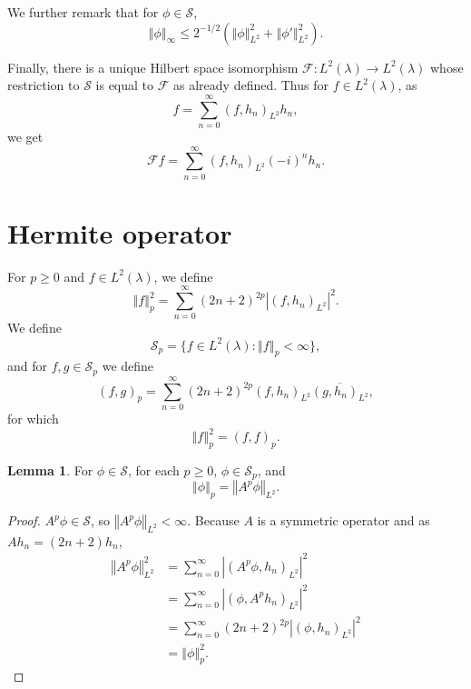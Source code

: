 \documentclass{article}
\newcommand{\norm}[1]{\left\Vert #1 \right\Vert}
\theoremstyle{definition}
\newtheorem{lemma}[theorem]{Lemma}
\theoremstyle{definition}
\begin{document}
We further remark that for $\phi \in \mathscr{S}$,
\begin{equation}
\norm{\phi}_{\infty} \leq 2^{-1/2}(\norm{\phi}_{L^2}^2+\norm{\phi'}_{L^2}^2).
\label{supremum}
\end{equation}

Finally, there is a unique Hilbert space isomorphism $\mathscr{F}:L^2(\lambda) \to L^2(\lambda)$ whose
restriction to $\mathscr{S}$ is equal to $\mathscr{F}$ as already defined. Thus for $f \in L^2(\lambda)$, as
\[
f=\sum_{n=0}^\infty (f,h_n)_{L^2} h_n,
\]
we get
\[
\mathscr{F}f = \sum_{n=0}^\infty (f,h_n)_{L^2} (-i)^n h_n.
\]


\section{Hermite operator}
For $p \geq 0$ and $f \in L^2(\lambda)$, we define
\[
\norm{f}_p^2 = \sum_{n=0}^\infty (2n+2)^{2p} |(f,h_n)_{L^2}|^2.
\]
We define 
\[
\mathscr{S}_p = \{f \in L^2(\lambda): \norm{f}_p < \infty\},
\]
and for $f,g \in \mathscr{S}_p$ we define
\[
(f,g)_p = \sum_{n=0}^\infty (2n+2)^{2p} (f,h_n)_{L^2} \overline{(g,h_n)_{L^2}},
\]
for which
\[
\norm{f}_p^2 = (f,f)_p. 
\]

\begin{lemma}
For $\phi \in \mathscr{S}$, for each $p \geq 0$, $\phi \in \mathscr{S}_p$,
and 
\[
\norm{\phi}_p = \norm{A^p \phi}_{L^2}.
\]
\label{phermite}
\end{lemma}
\begin{proof}
$A^p \phi \in \mathscr{S}$, so
$\norm{A^p \phi}_{L^2}<\infty$. 
Because $A$ is a symmetric operator and
as $Ah_n=(2n+2) h_n$,
\begin{align*}
\norm{A^p\phi}_{L^2}^2&=\sum_{n=0}^\infty |(A^p\phi,h_n)_{L^2}|^2\\
&=\sum_{n=0}^\infty |(\phi,A^ph_n)_{L^2}|^2\\
&=\sum_{n=0}^\infty (2n+2)^{2p} |(\phi,h_n)_{L^2}|^2\\
&=\norm{\phi}_p^2.
\end{align*}
\end{proof}
\end{document}
